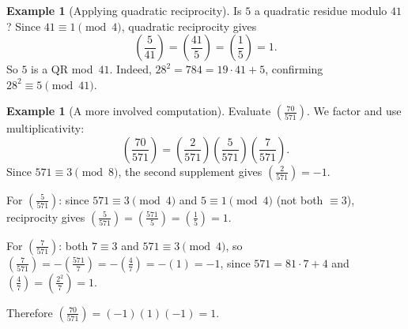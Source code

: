 \documentclass[12pt,a4paper,openany]{book}
\theoremstyle{definition}
\newtheorem{example}[definition]{Example}
\theoremstyle{plain}
\theoremstyle{remark}
\newcommand{\legendre}[2]{\left(\frac{#1}{#2}\right)}
\begin{document}
\begin{example}[Applying quadratic reciprocity]
\label{ex:qr-application}
Is $5$ a quadratic residue modulo $41$? Since $41 \equiv 1 \pmod{4}$,
quadratic reciprocity gives
\[
  \legendre{5}{41} = \legendre{41}{5} = \legendre{1}{5} = 1.
\]
So $5$ is a QR mod~$41$.
Indeed, $28^2 = 784 = 19 \cdot 41 + 5$, confirming $28^2 \equiv 5 \pmod{41}$.
\end{example}

\begin{example}[A more involved computation]
\label{ex:qr-involved}
Evaluate $\legendre{70}{571}$. We factor and use multiplicativity:
\[
  \legendre{70}{571} = \legendre{2}{571}\legendre{5}{571}\legendre{7}{571}.
\]
Since $571 \equiv 3 \pmod{8}$, the second supplement gives $\legendre{2}{571} = -1$.

For $\legendre{5}{571}$: since $571 \equiv 3 \pmod{4}$ and $5 \equiv 1 \pmod{4}$
(not both $\equiv 3$), reciprocity gives
$\legendre{5}{571} = \legendre{571}{5} = \legendre{1}{5} = 1$.

For $\legendre{7}{571}$: both $7 \equiv 3$ and $571 \equiv 3 \pmod{4}$, so
$\legendre{7}{571} = -\legendre{571}{7} = -\legendre{4}{7} = -(1) = -1$,
since $571 = 81 \cdot 7 + 4$ and $\legendre{4}{7} = \legendre{2^2}{7} = 1$.

Therefore $\legendre{70}{571} = (-1)(1)(-1) = 1$.
\end{example}
\end{document}
